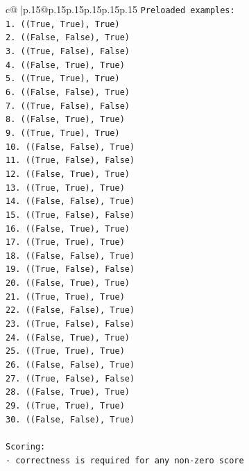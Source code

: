 \documentclass{article}
\begin{document}
{\begin{supertabular}{c@{$\;$}|p{.15\linewidth}@{}p{.15\linewidth}p{.15\linewidth}p{.15\linewidth}p{.15\linewidth}p{.15\linewidth}}
{{{\texttt{Preloaded examples:} \\
\texttt{1. ((True, True), True)} \\
\texttt{2. ((False, False), True)} \\
\texttt{3. ((True, False), False)} \\
\texttt{4. ((False, True), True)} \\
\texttt{5. ((True, True), True)} \\
\texttt{6. ((False, False), True)} \\
\texttt{7. ((True, False), False)} \\
\texttt{8. ((False, True), True)} \\
\texttt{9. ((True, True), True)} \\
\texttt{10. ((False, False), True)} \\
\texttt{11. ((True, False), False)} \\
\texttt{12. ((False, True), True)} \\
\texttt{13. ((True, True), True)} \\
\texttt{14. ((False, False), True)} \\
\texttt{15. ((True, False), False)} \\
\texttt{16. ((False, True), True)} \\
\texttt{17. ((True, True), True)} \\
\texttt{18. ((False, False), True)} \\
\texttt{19. ((True, False), False)} \\
\texttt{20. ((False, True), True)} \\
\texttt{21. ((True, True), True)} \\
\texttt{22. ((False, False), True)} \\
\texttt{23. ((True, False), False)} \\
\texttt{24. ((False, True), True)} \\
\texttt{25. ((True, True), True)} \\
\texttt{26. ((False, False), True)} \\
\texttt{27. ((True, False), False)} \\
\texttt{28. ((False, True), True)} \\
\texttt{29. ((True, True), True)} \\
\texttt{30. ((False, False), True)} \\
\\ 
\texttt{Scoring:} \\
\texttt{{-} correctness is required for any non{-}zero score} \\
}}}
\end{supertabular}}
\end{document}

